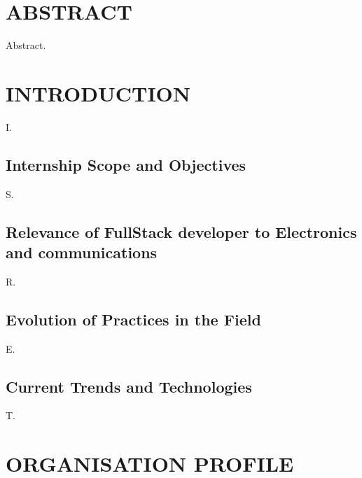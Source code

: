 \documentclass[12pt,a4paper]{report}
\begin{document}
\newpage
\chapter*{ABSTRACT}


Abstract.


\newpage
\tableofcontents
{}

\newpage
\listoffigures
{}

\chapter{INTRODUCTION}


I.


\section{Internship Scope and Objectives}

S.


\section{Relevance of FullStack developer to Electronics and communications}

R.


\section{Evolution of Practices in the Field}

E.


\section{Current Trends and Technologies}

T.




\chapter{ORGANISATION PROFILE}
\end{document}
